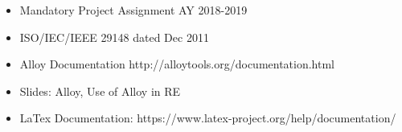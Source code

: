 \documentclass[a4paper]{article}
\begin{document}
    \begin{itemize}
        \item Mandatory Project Assignment AY 2018-2019
        \item ISO/IEC/IEEE 29148 dated Dec 2011
        \item Alloy Documentation http://alloytools.org/documentation.html
        \item Slides: Alloy, Use of Alloy in RE
        \item LaTex Documentation: https://www.latex-project.org/help/documentation/
        
    \end{itemize}

    
    
\end{document}
